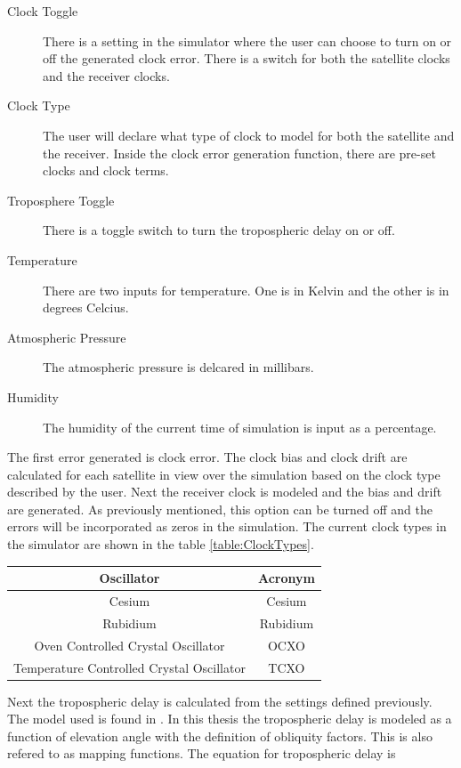 \documentclass[12pt]{report}
\begin{document}
\begin{description}
    \item[Clock Toggle] There is a setting in the simulator where the user can choose to turn on or off the generated clock error. There is a switch for both the satellite clocks and the receiver clocks.
    \item[Clock Type] The user will declare what type of clock to model for both the satellite and the receiver. Inside the clock error generation function, there are pre-set clocks and clock terms.
    \item[Troposphere Toggle] There is a toggle switch to turn the tropospheric delay on or off.
    \item[Temperature] There are two inputs for temperature. One is in Kelvin and the other is in degrees Celcius. 
    \item[Atmospheric Pressure] The atmospheric pressure is delcared in millibars.
    \item[Humidity] The humidity of the current time of simulation is input as a percentage.     
\end{description}


The first error generated is clock error. The clock bias and clock drift are calculated for each satellite in view over the simulation based on the clock type described by the user. Next the receiver clock is modeled and the bias and drift are generated. As previously mentioned, this option can be turned off and the errors will be incorporated as zeros in the simulation. The current clock types in the simulator are shown in the table \ref{table:ClockTypes}. 

\begin{center}
\begin{tabular}{|c|c|}
    \hline
    Oscillator & Acronym\\
    \hline\hline
    Cesium & Cesium\\
    \hline
    Rubidium & Rubidium\\
    \hline
    Oven Controlled Crystal Oscillator & OCXO\\
    \hline
    Temperature Controlled Crystal Oscillator & TCXO\\
    \hline
\end{tabular}
\label{table:ClockTypes}

\end{center}

Next the tropospheric delay is calculated from the settings defined previously. The model used is found in \cite{misraGlobalPositioningSystem2012}. In this thesis the tropospheric delay is modeled as a function of elevation angle with the definition of obliquity factors. This is also refered to as mapping functions. The equation for tropospheric delay is 
\end{document}
